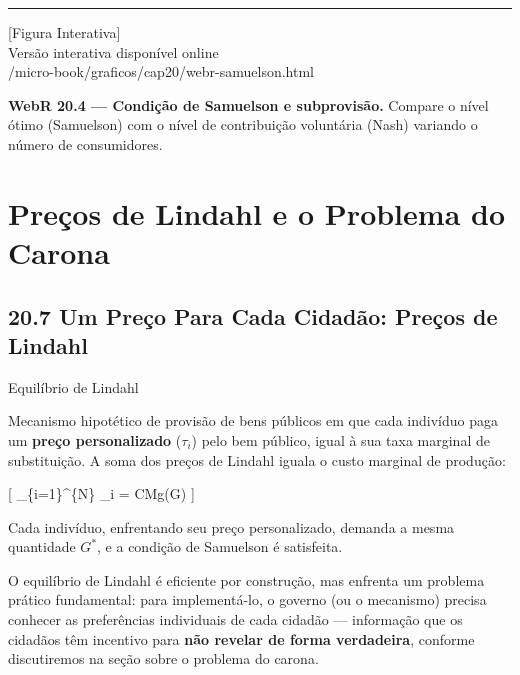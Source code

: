 \documentclass[11pt,twoside,openright]{book}
\newcommand{\figurePlaceholder}[1]{%
  \begin{center}
    \begin{tcolorbox}[
      width=0.85\textwidth,
      colback=graybg,
      colframe=gray,
      boxrule=0.5pt,
      arc=2pt,
      halign=center,
      valign=center,
      height=5cm
    ]
      \centering
      \vfill
      {\sffamily\color{gray}\large [Figura Interativa]}\\[6pt]
      {\sffamily\small\color{gray} Versão interativa disponível online}\\[4pt]
      {\ttfamily\tiny\color{gray} #1}
      \vfill
    \end{tcolorbox}
  \end{center}
}
\begin{document}
\begin{center}\rule{0.5\linewidth}{0.5pt}\end{center}

\figurePlaceholder{/micro-book/graficos/cap20/webr-samuelson.html}

\textbf{WebR 20.4 --- Condição de Samuelson e subprovisão.} Compare o
nível ótimo (Samuelson) com o nível de contribuição voluntária (Nash)
variando o número de consumidores.

\chapter{Preços de Lindahl e o Problema do
Carona}\label{preuxe7os-de-lindahl-e-o-problema-do-carona}

\section{20.7 Um Preço Para Cada Cidadão: Preços de Lindahl}\label{207}

\begin{definitionbox}{Equilíbrio de Lindahl}

Mecanismo hipotético de provisão de bens públicos em que cada indivíduo
paga um \textbf{preço personalizado} (\(\tau_i\)) pelo bem público,
igual à sua taxa marginal de substituição. A soma dos preços de Lindahl
iguala o custo marginal de produção:

{[} \sum\_\{i=1\}\^{}\{N\} \tau\_i = CMg(G) \label{eq:20.13} 
{]}

Cada indivíduo, enfrentando seu preço personalizado, demanda a mesma
quantidade \(G^*\), e a condição de Samuelson é satisfeita.

\end{definitionbox}

O equilíbrio de Lindahl é eficiente por construção, mas enfrenta um
problema prático fundamental: para implementá-lo, o governo (ou o
mecanismo) precisa conhecer as preferências individuais de cada cidadão
--- informação que os cidadãos têm incentivo para \textbf{não revelar de
forma verdadeira}, conforme discutiremos na seção sobre o problema do
carona.
\end{document}
